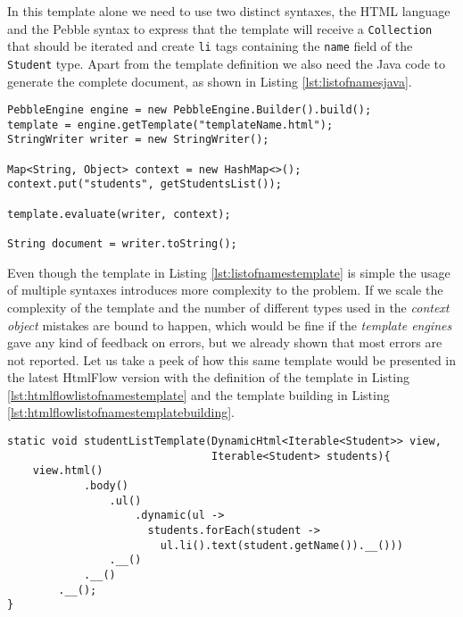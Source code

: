 \noindent
In this template alone we need to use two distinct syntaxes, the \ac{HTML} language and the Pebble syntax to express that the template will receive a \texttt{Collection} that should be iterated  and create \texttt{li} tags containing the \texttt{name} field of the \texttt{Student} type. Apart from the template definition we also need the Java code to generate the complete document, as shown in Listing \ref{lst:listofnamesjava}.

\bigskip


\begin{minipage}{\linewidth}
\begin{lstlisting}[caption={List of Student Names - Template Building in Java using Pebble}, label={lst:listofnamesjava}]
PebbleEngine engine = new PebbleEngine.Builder().build();
template = engine.getTemplate("templateName.html");
StringWriter writer = new StringWriter();

Map<String, Object> context = new HashMap<>();
context.put("students", getStudentsList());

template.evaluate(writer, context);

String document = writer.toString();
\end{lstlisting}
\end{minipage} 

\noindent
Even though the template in Listing \ref{lst:listofnamestemplate} is simple the usage of multiple syntaxes introduces more complexity to the problem. If we scale the complexity of the template and the number of different types used in the \textit{context object} mistakes are bound to happen, which would be fine if the \textit{template engines} gave any kind of feedback on errors, but we already shown that most errors are not reported. Let us take a peek of how this same template would be presented in the latest HtmlFlow version with the definition of the template in Listing \ref{lst:htmlflowlistofnamestemplate} and the template building in Listing \ref{lst:htmlflowlistofnamestemplatebuilding}.

\bigskip


\begin{minipage}{\linewidth}
\begin{lstlisting}[caption={List of Student Names - Template Definition using HtmlFlow with xmlet}, label={lst:htmlflowlistofnamestemplate}]
static void studentListTemplate(DynamicHtml<Iterable<Student>> view,                                
                                Iterable<Student> students){
    view.html()
            .body()
                .ul()
                    .dynamic(ul -> 
                      students.forEach(student ->                   
                        ul.li().text(student.getName()).__()))
                .__()
            .__()
        .__();
}
\end{lstlisting}
\end{minipage} 

